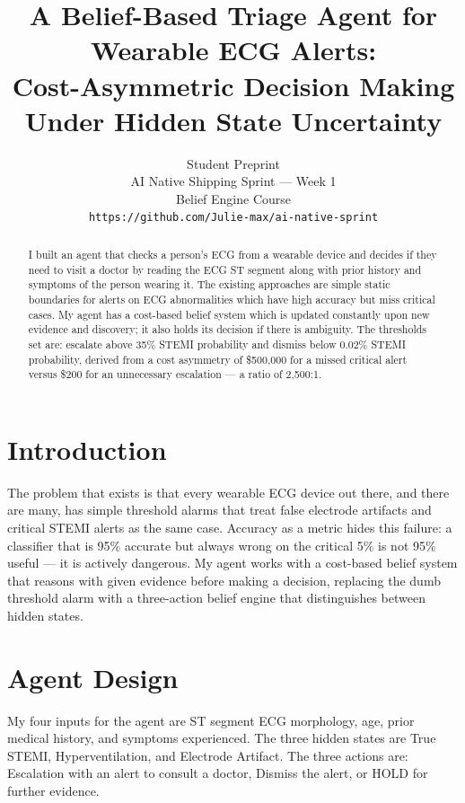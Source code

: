 \documentclass[letterpaper]{article}
\title{A Belief-Based Triage Agent for Wearable ECG Alerts:\\
Cost-Asymmetric Decision Making Under Hidden State Uncertainty}
\author{
    Student Preprint\\
    AI Native Shipping Sprint --- Week 1\\
    Belief Engine Course\\
    \texttt{https://github.com/Julie-max/ai-native-sprint}
}
\date{}
\begin{document}
\maketitle

\begin{abstract}
I built an agent that checks a person's ECG from a wearable device
and decides if they need to visit a doctor by reading the ECG ST
segment along with prior history and symptoms of the person wearing
it. The existing approaches are simple static boundaries for alerts
on ECG abnormalities which have high accuracy but miss critical
cases. My agent has a cost-based belief system which is updated
constantly upon new evidence and discovery; it also holds its
decision if there is ambiguity. The thresholds set are: escalate
above 35\% STEMI probability and dismiss below 0.02\% STEMI
probability, derived from a cost asymmetry of \$500,000 for a
missed critical alert versus \$200 for an unnecessary escalation
--- a ratio of 2,500:1.
\end{abstract}

\section{Introduction}
The problem that exists is that every wearable ECG device out there,
and there are many, has simple threshold alarms that treat false
electrode artifacts and critical STEMI alerts as the same case.
Accuracy as a metric hides this failure: a classifier that is 95\%
accurate but always wrong on the critical 5\% is not 95\% useful
--- it is actively dangerous.
My agent works with a cost-based belief system that reasons with
given evidence before making a decision, replacing the dumb
threshold alarm with a three-action belief engine that distinguishes
between hidden states.

\section{Agent Design}
My four inputs for the agent are ST segment ECG morphology, age,
prior medical history, and symptoms experienced. The three hidden
states are True STEMI, Hyperventilation, and Electrode Artifact.
The three actions are: Escalation with an alert to consult a doctor,
Dismiss the alert, or HOLD for further evidence.
\end{document}
